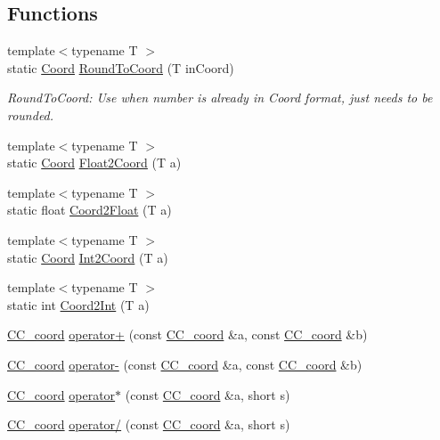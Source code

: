 \subsection*{Functions}
\begin{DoxyCompactItemize}
\item 
{\footnotesize template$<$typename T $>$ }\\static \hyperlink{a00216_acd9dae57b712df0e2d3588c0c4798c11}{Coord} \hyperlink{a00204_a1fec18cc9b800a04f2d11a79376f2c6b}{Round\-To\-Coord} (T in\-Coord)
\begin{DoxyCompactList}\small\item\em Round\-To\-Coord\-: Use when number is already in Coord format, just needs to be rounded. \end{DoxyCompactList}\item 
{\footnotesize template$<$typename T $>$ }\\static \hyperlink{a00216_acd9dae57b712df0e2d3588c0c4798c11}{Coord} \hyperlink{a00204_a4c57c50ed7bc510337fe08fce0961110}{Float2\-Coord} (T a)
\item 
{\footnotesize template$<$typename T $>$ }\\static float \hyperlink{a00204_a1dd8914bcbb6dfa2b8828d146119ae8e}{Coord2\-Float} (T a)
\item 
{\footnotesize template$<$typename T $>$ }\\static \hyperlink{a00216_acd9dae57b712df0e2d3588c0c4798c11}{Coord} \hyperlink{a00204_a1bc12e8db97070dae0b6256347c8c2d6}{Int2\-Coord} (T a)
\item 
{\footnotesize template$<$typename T $>$ }\\static int \hyperlink{a00204_a9ba25c9395aed112747ca79c9c610829}{Coord2\-Int} (T a)
\item 
\hyperlink{a00029}{C\-C\-\_\-coord} \hyperlink{a00204_a5d16877184a5de9262db453c5dea3a5c}{operator+} (const \hyperlink{a00029}{C\-C\-\_\-coord} \&a, const \hyperlink{a00029}{C\-C\-\_\-coord} \&b)
\item 
\hyperlink{a00029}{C\-C\-\_\-coord} \hyperlink{a00204_a02471aedf00cd82ee0e3952e60de9fa3}{operator-\/} (const \hyperlink{a00029}{C\-C\-\_\-coord} \&a, const \hyperlink{a00029}{C\-C\-\_\-coord} \&b)
\item 
\hyperlink{a00029}{C\-C\-\_\-coord} \hyperlink{a00204_a410cd0b49723d8d45df095365c2ea977}{operator$\ast$} (const \hyperlink{a00029}{C\-C\-\_\-coord} \&a, short s)
\item 
\hyperlink{a00029}{C\-C\-\_\-coord} \hyperlink{a00204_a65f469ad3da6efee438034d94e37f82d}{operator/} (const \hyperlink{a00029}{C\-C\-\_\-coord} \&a, short s)

\end{DoxyCompactItemize}
